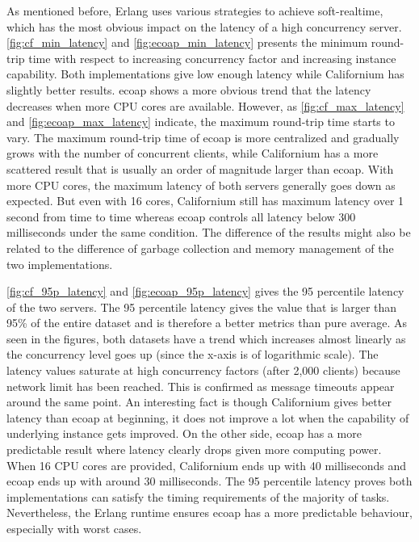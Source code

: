 As mentioned before, Erlang uses various strategies to achieve soft-realtime, which has the most obvious impact on the latency of a high concurrency server. \autoref{fig:cf_min_latency} and \autoref{fig:ecoap_min_latency} presents the minimum round-trip time with respect to increasing concurrency factor and increasing instance capability. Both implementations give low enough latency while Californium has slightly better results. ecoap shows a more obvious trend that the latency decreases when more CPU cores are available. However, as \autoref{fig:cf_max_latency} and \autoref{fig:ecoap_max_latency} indicate, the maximum round-trip time starts to vary. The maximum round-trip time of ecoap is more centralized and gradually grows with the number of concurrent clients, while Californium has a more scattered result that is usually an order of magnitude larger than ecoap. With more CPU cores, the maximum latency of both servers generally goes down as expected. But even with 16 cores, Californium still has maximum latency over 1 second from time to time whereas ecoap controls all latency below 300 milliseconds under the same condition. The difference of the results might also be related to the difference of garbage collection and memory management of the two implementations.

\autoref{fig:cf_95p_latency} and \autoref{fig:ecoap_95p_latency} gives the 95 percentile latency of the two servers. The 95 percentile latency gives the value that is larger than 95\% of the entire dataset and is therefore a better metrics than pure average. As seen in the figures, both datasets have a trend which increases almost linearly as the concurrency level goes up (since the x-axis is of logarithmic scale). The latency values saturate at high concurrency factors (after 2,000 clients) because network limit has been reached. This is confirmed as message timeouts appear around the same point. An interesting fact is though Californium gives better latency than ecoap at beginning, it does not improve a lot when the capability of underlying instance gets improved. On the other side, ecoap has a more predictable result where latency clearly drops given more computing power. When 16 CPU cores are provided, Californium ends up with 40 milliseconds and ecoap ends up with around 30 milliseconds. The 95 percentile latency proves both implementations can satisfy the timing requirements of the majority of tasks. Nevertheless, the Erlang runtime ensures ecoap has a more predictable behaviour, especially with worst cases.

